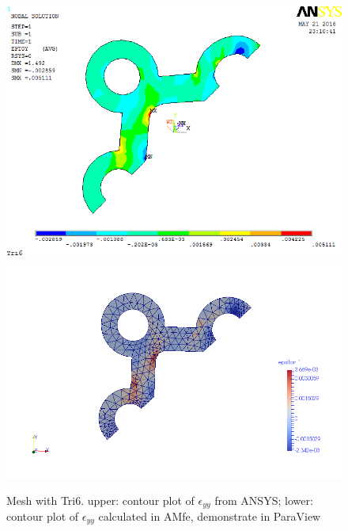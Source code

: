 \begin{figure}[htbp]
	\begin{center}
		\includegraphics[width=13cm,clip]{Tri6_Eyy.png} 		
		\includegraphics[width=13cm,clip]{Tri6_Eyy_P.png} 		
		\caption{Mesh with Tri6. upper: contour plot of $\epsilon_{yy}$ from ANSYS; lower: contour plot of $\epsilon_{yy}$ calculated in AMfe, demonstrate in ParaView} \label{fig: Tri6_Eyy}
	\end{center}
\end{figure}
\clearpage 

